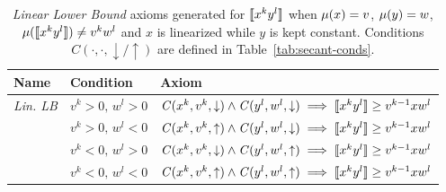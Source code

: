 \begin{table}[ht]
	\centering
	\setlength{\tabcolsep}{1.2em}
	\renewcommand{\arraystretch}{1.3}
	\begin{tabular}{@{}lll@{}}
		\hline
		\textbf{Name}    & \textbf{Condition}        & \textbf{Axiom}                                                                                          \\
		\hline
		\textit{Lin. LB} & $v^k > 0, \,w^l > 0$ & $\mathit{C}(x^k, v^k,\downarrow) \land \mathit{C}(y^l, w^l,\downarrow) \implies \llbracket x^k y^l \rrbracket \geq v^{k-1}xw^l$ \\
		                 & $v^k > 0, \,w^l < 0$ & $\mathit{C}(x^k, v^k,\uparrow) \land \mathit{C}(y^l, w^l,\downarrow) \implies \llbracket x^k y^l \rrbracket \geq v^{k-1}xw^l$   \\
		                 & $v^k < 0, \,w^l > 0$ & $\mathit{C}(x^k, v^k,\downarrow) \land \mathit{C}(y^l, w^l,\uparrow) \implies \llbracket x^k y^l \rrbracket \geq v^{k-1}xw^l$   \\
		                 & $v^k < 0, \,w^l < 0$ & $\mathit{C}(x^k, v^k,\uparrow) \land \mathit{C}(y^l, w^l,\uparrow) \implies \llbracket x^k y^l \rrbracket \geq v^{k-1}xw^l$     \\
		\hline
	\end{tabular}
	\vspace{0.9em}
	\caption{%
		\textit{Linear Lower Bound} axioms generated for $\llbracket x^k y^l \rrbracket$ when $\mu(x)=v$, $\mu(y)=w$, $\mu(\llbracket x^k y^l \rrbracket)\neq v^kw^l$ and
		$x$ is linearized while $y$ is kept constant.
		Conditions $\mathit{C}(\cdot,\cdot,\downarrow/\uparrow)$ are defined in Table~\ref{tab:secant-conds}.\label{tab:mul-axioms-lb}}
\end{table}

